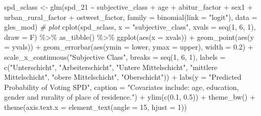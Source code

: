 \documentclass[
]{article}
\newenvironment{Shaded}{\begin{snugshade}}{\end{snugshade}}
\newcommand{\AttributeTok}[1]{\textcolor[rgb]{0.77,0.63,0.00}{#1}}
\newcommand{\CommentTok}[1]{\textcolor[rgb]{0.56,0.35,0.01}{\textit{#1}}}
\newcommand{\DecValTok}[1]{\textcolor[rgb]{0.00,0.00,0.81}{#1}}
\newcommand{\FloatTok}[1]{\textcolor[rgb]{0.00,0.00,0.81}{#1}}
\newcommand{\FunctionTok}[1]{\textcolor[rgb]{0.00,0.00,0.00}{#1}}
\newcommand{\NormalTok}[1]{#1}
\newcommand{\OtherTok}[1]{\textcolor[rgb]{0.56,0.35,0.01}{#1}}
\newcommand{\SpecialCharTok}[1]{\textcolor[rgb]{0.00,0.00,0.00}{#1}}
\newcommand{\StringTok}[1]{\textcolor[rgb]{0.31,0.60,0.02}{#1}}
\begin{document}
\begin{Shaded}
\begin{Highlighting}[]
\NormalTok{spd\_sclass }\OtherTok{\textless{}{-}} \FunctionTok{glm}\NormalTok{(spd\_21 }\SpecialCharTok{\textasciitilde{}}\NormalTok{ subjective\_class }\SpecialCharTok{+}\NormalTok{ age }\SpecialCharTok{+}\NormalTok{ abitur\_factor }\SpecialCharTok{+}\NormalTok{ sex1 }\SpecialCharTok{+}\NormalTok{ urban\_rural\_factor }\SpecialCharTok{+}\NormalTok{ ostwest\_factor, }\AttributeTok{family =} \FunctionTok{binomial}\NormalTok{(}\AttributeTok{link =} \StringTok{"logit"}\NormalTok{), }\AttributeTok{data =}\NormalTok{ gles\_mod)}
\CommentTok{\# plot }
\FunctionTok{cplot}\NormalTok{(spd\_sclass, }\AttributeTok{x =} \StringTok{"subjective\_class"}\NormalTok{, }
      \AttributeTok{xvals =} \FunctionTok{seq}\NormalTok{(}\DecValTok{1}\NormalTok{, }\DecValTok{6}\NormalTok{, }\DecValTok{1}\NormalTok{), }\AttributeTok{draw =}\NormalTok{ F) }\SpecialCharTok{\%\textgreater{}\%}
  \FunctionTok{as\_tibble}\NormalTok{() }\SpecialCharTok{\%\textgreater{}\%}
  \FunctionTok{ggplot}\NormalTok{(}\FunctionTok{aes}\NormalTok{(}\AttributeTok{x =}\NormalTok{ xvals)) }\SpecialCharTok{+}
  \FunctionTok{geom\_point}\NormalTok{(}\FunctionTok{aes}\NormalTok{(}\AttributeTok{y =}\NormalTok{ yvals)) }\SpecialCharTok{+}
  \FunctionTok{geom\_errorbar}\NormalTok{(}\FunctionTok{aes}\NormalTok{(}\AttributeTok{ymin =}\NormalTok{ lower, }\AttributeTok{ymax =}\NormalTok{ upper), }\AttributeTok{width =} \FloatTok{0.2}\NormalTok{) }\SpecialCharTok{+}
  \FunctionTok{scale\_x\_continuous}\NormalTok{(}\StringTok{"Subjective Class"}\NormalTok{, }
                     \AttributeTok{breaks =} \FunctionTok{seq}\NormalTok{(}\DecValTok{1}\NormalTok{, }\DecValTok{6}\NormalTok{, }\DecValTok{1}\NormalTok{), }
                     \AttributeTok{labels =} \FunctionTok{c}\NormalTok{(}\StringTok{"Unterschicht"}\NormalTok{, }\StringTok{"Arbeiterschicht"}\NormalTok{, }
                                \StringTok{"Untere Mittelschicht"}\NormalTok{, }\StringTok{"mittlere Mittelschicht"}\NormalTok{, }
                                \StringTok{"obere Mittelschicht"}\NormalTok{, }\StringTok{"Oberschicht"}\NormalTok{)) }\SpecialCharTok{+}
  \FunctionTok{labs}\NormalTok{(}\AttributeTok{y =} \StringTok{"Predicted Probability of Voting SPD"}\NormalTok{, }
       \AttributeTok{caption =} \StringTok{"Covariates include: age, education, gender and rurality of place of residence."}\NormalTok{) }\SpecialCharTok{+}
  \FunctionTok{ylim}\NormalTok{(}\FunctionTok{c}\NormalTok{(}\FloatTok{0.1}\NormalTok{, }\FloatTok{0.5}\NormalTok{)) }\SpecialCharTok{+}
  \FunctionTok{theme\_bw}\NormalTok{() }\SpecialCharTok{+}
  \FunctionTok{theme}\NormalTok{(}\AttributeTok{axis.text.x =} \FunctionTok{element\_text}\NormalTok{(}\AttributeTok{angle =} \DecValTok{15}\NormalTok{, }\AttributeTok{hjust =} \DecValTok{1}\NormalTok{))}
\end{Highlighting}
\end{Shaded}
\end{document}
